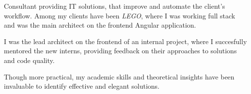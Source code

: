 Consultant providing IT solutions, that improve and automate the client's
workflow. Among my clients have been \emph{LEGO}, where I was working full stack
and was the main architect on the frontend Angular application.

\medskip

I was the lead architect on the frontend of an internal project, where I
succesfully mentored the new interns, providing feedback on their approaches to
solutions and code quality.

\medskip

Though more practical, my academic skills and theoretical insights have been
invaluable to identify effective and elegant solutions.


